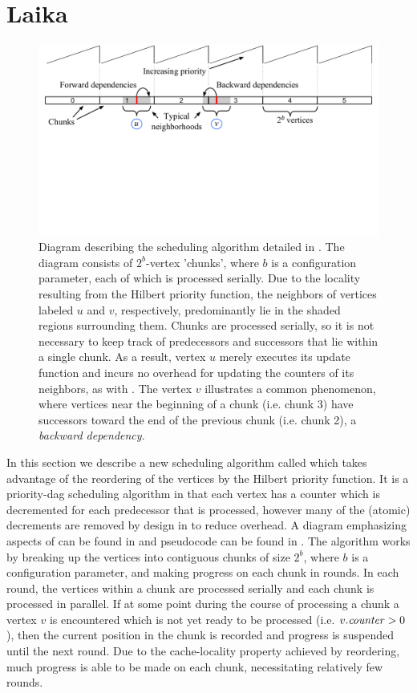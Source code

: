 \section{Laika}
\label{sec:laika}

\begin{figure}[h]
\centering
\includegraphics[width=4.8in,clip,trim=0cm 7cm 0 0]{figures/laika_diagram.pdf}
\caption{Diagram describing the scheduling algorithm 
detailed in .  The diagram consists of $2^b$-vertex
'chunks', where $b$ is a configuration parameter, 
each of which is processed serially.  Due to the locality resulting
from the Hilbert priority function, the neighbors of vertices
labeled $u$ and $v$, respectively, predominantly lie in the shaded regions
surrounding them.  Chunks are processed serially, so it is not necessary
to keep track of predecessors and successors that lie within a single
chunk.  As a result, vertex $u$ merely executes its update function 
and incurs no overhead for updating the counters of its neighbors, as
with .  The vertex $v$ illustrates a common 
phenomenon, where vertices near the beginning of a chunk 
(i.e. chunk 3) have successors toward the end of the previous 
chunk (i.e. chunk 2), a \emph{backward dependency}.}
\label{fig:laika_diagram}
\end{figure}

In this section we describe a new scheduling algorithm
called  which takes advantage of the reordering
of the vertices by the Hilbert priority function.  It is
a priority-dag scheduling algorithm in that each vertex has
a counter which is decremented for each predecessor that is
processed, however many of the (atomic) decrements are removed
by design in  to reduce overhead.  A
diagram emphasizing aspects of  can be
found in  and pseudocode can be
found in .  The algorithm
works by breaking up the vertices into contiguous chunks of
size $2^b$, where $b$ is a configuration parameter, and making
progress on each chunk in rounds.  In each round, the vertices
within a chunk are processed serially and each chunk is processed
in parallel.  If at some point during the course of processing
a chunk a vertex $v$ is encountered which is not yet ready to be
processed (i.e. $\attrib{v}{\id{counter}} > 0$), then the current
position in the chunk is recorded and progress is suspended until
the next round.  Due to the cache-locality property achieved
by reordering, much progress is able to be made on each chunk,
necessitating relatively few rounds. 


